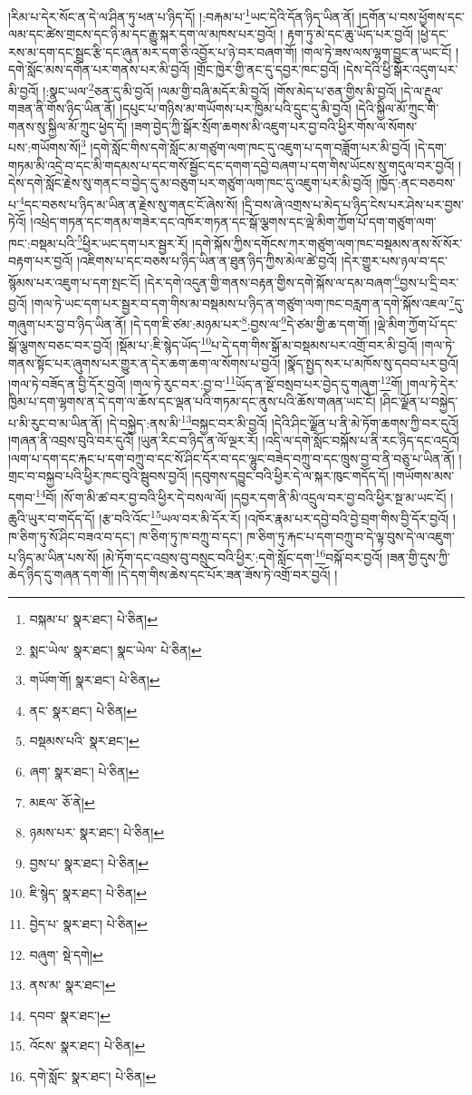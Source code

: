 །རིམ་པ་དེར་སོང་ན་དེ་ལ་ཤིན་ཏུ་ཕན་པ་ཉིད་དོ། །:བརྐམ་པ་\footnote{བསྐམ་པ་  སྣར་ཐང་།  པེ་ཅིན། }ཡང་དེའི་དོན་ཉིད་ཡིན་ནོ། །དགོན་པ་བས་ཕྱོགས་དང་ལམ་དང་ཚེས་གྲངས་དང་ཉི་མ་དང་རྒྱུ་སྐར་དག་ལ་མཁས་པར་བྱའོ། །
རྟག་ཏུ་མེ་དང་ཆུ་ཡོད་པར་བྱའོ། །ཕྱེ་དང་རས་མ་དག་དང་སྦྲང་རྩི་དང་ཞུན་མར་དག་ཅི་འབྱོར་པ་ཉེ་བར་བཞག་གོ། །གལ་ཏེ་ཟས་ལས་ལྷག་བྱུང་ན་ཡང་ངོ། །དགེ་སློང་མས་དགོན་པར་གནས་པར་མི་བྱའོ། །གྲོང་ཁྱེར་གྱི་ནང་དུ་དབྱར་ཁང་བྱའོ། །དེས་དེའི་ཕྱི་སྒོར་འདུག་པར་མི་བྱའོ། །:སྣང་ཡལ་\footnote{སྨང་ཡེལ་  སྣར་ཐང་། སྣང་ཡེལ་  པེ་ཅིན། }ཅན་དུ་མི་བྱའོ། །ལམ་གྱི་བཞི་མདོར་མི་བྱའོ། །གོས་མེད་པ་ཅན་གྱིས་མི་བྱའོ། །དེ་ལ་རྔུལ་གཟན་ནི་གོས་ཉིད་ཡིན་ནོ། །དཔུང་པ་གཉིས་མ་གཡོགས་པར་ཁྱིམ་པའི་དྲུང་དུ་མི་བྱའོ། །དེའི་སྐྱིལ་མོ་ཀྲུང་གི་གནས་སུ་སྐྱིལ་མོ་ཀྲུང་ཕྱེད་དོ། །ཟག་བྱེད་ཀྱི་སྒོར་སྲོག་ཆགས་མི་འཇུག་པར་བྱ་བའི་ཕྱིར་གོས་ལ་སོགས་པས་:གཡོགས་སོ།\footnote{གཡོག་གོ།  སྣར་ཐང་།  པེ་ཅིན། } །དགེ་སློང་གིས་དགེ་སློང་མ་གཙུག་ལག་ཁང་དུ་འཇུག་པ་དག་བཟློག་པར་མི་བྱའོ། །དེ་དག་གཏམ་མི་འདྲེ་བ་དང་མི་གདམས་པ་དང་གསོ་སྦྱོང་དང་དགག་དབྱེ་བཞག་པ་དག་གིས་ཡོངས་སུ་གདུལ་བར་བྱའོ། །དེས་དགེ་སློང་རྗེས་སུ་གནང་བ་བྱེད་དུ་མ་བཅུག་པར་གཙུག་ལག་ཁང་དུ་འཇུག་པར་མི་བྱའོ། །ཁྱོད་:ནང་བཅབས་པ་\footnote{ནང་  སྣར་ཐང་།  པེ་ཅིན། }དང་བཅས་པ་ཉིད་མ་ཡིན་ན་རྗེས་སུ་གནང་ངོ་ཞེས་སོ། །དྲི་བས་ཞེ་འགྲས་པ་མེད་པ་ཉིད་ངེས་པར་ཤེས་པར་བྱས་ཏེའོ། །འཕྲེད་གཏན་དང་གནམ་གཟེར་དང་འཁོར་གཏན་དང་སྒོ་ལྕགས་དང་ལྡེ་མིག་ཀྱོག་པོ་དག་གཙུག་ལག་ཁང་:བསྡམ་པའི་\footnote{བསྡམས་པའི་  སྣར་ཐང་། }ཕྱིར་ཡང་དག་པར་སྦྱར་རོ། །དགེ་སྐོས་ཀྱིས་དགོངས་ཀར་གཙུག་ལག་ཁང་བསྡམས་ནས་སོ་སོར་བརྟག་པར་བྱའོ། །འཇིགས་པ་དང་བཅས་པ་ཉིད་ཡིན་ན་ཐུན་ཉིད་ཀྱིས་མེལ་ཚེ་བྱའོ། །དེར་གྱུར་པས་ཉལ་བ་དང་སྙོམས་པར་འཇུག་པ་དག་སྤང་ངོ། །དེར་དགེ་འདུན་གྱི་གནས་བརྟན་གྱིས་དགེ་སྐོས་ལ་དམ་བཞག་\footnote{ཞག་  སྣར་ཐང་།  པེ་ཅིན། }བྱས་པ་དྲི་བར་བྱའོ། །གལ་ཏེ་ཡང་དག་པར་སྦྱར་བ་དག་གིས་མ་བསྡམས་པ་ཉིད་ན་གཙུག་ལག་ཁང་བརླག་ན་དགེ་སྐོས་འཇལ་\footnote{མཇལ་  ཅོ་ནེ། }དུ་གཞུག་པར་བྱ་བ་ཉིད་ཡིན་ནོ། །དེ་དག་ཇི་ཙམ་:མཉམ་པར་\footnote{ཉམས་པར་  སྣར་ཐང་།  པེ་ཅིན། }:བྱས་ལ་\footnote{བྱས་པ་  སྣར་ཐང་།  པེ་ཅིན། }དེ་ཙམ་གྱི་ཆ་དག་གོ། །ལྡེ་མིག་ཀྱོག་པོ་དང་སྒོ་ལྕགས་བཅང་བར་བྱའོ། །སྡོམ་པ་:ཇི་སྙེད་ཡོད་\footnote{ཇི་སྙེད་  སྣར་ཐང་།  པེ་ཅིན། }པ་དེ་དག་གིས་སྒོ་མ་བསྡམས་པར་འགྲོ་བར་མི་བྱའོ། །གལ་ཏེ་གནས་སྟོང་པར་ཞུགས་པར་གྱུར་ན་དེར་ཆག་ཆག་ལ་སོགས་པ་བྱའོ། །སྣོད་སྤྱད་སར་པ་མཁོས་སུ་དབབ་པར་བྱའོ། །གལ་ཏེ་བཟོད་ན་བྱི་དོར་བྱའོ། །གལ་ཏེ་རུང་བར་:བྱ་བ་\footnote{བྱེད་པ་  སྣར་ཐང་།  པེ་ཅིན། }ཡོད་ན་སྔོ་བསྲབ་པར་བྱེད་དུ་གཞུག་\footnote{བཞུག་  སྡེ་དགེ། }གོ། །གལ་ཏེ་དེར་ཁྱིམ་པ་དག་ལྷགས་ན་དེ་དག་ལ་ཆོས་དང་ལྡན་པའི་གཏམ་དང་ནུས་པའི་ཆོས་གཞན་ཡང་ངོ། །ཤིང་ལྗོན་པ་བསྐྱེད་པ་མི་རུང་བ་མ་ཡིན་ནོ། །དེ་བསྐྱེད་:ནས་མི་\footnote{ནས་མ་  སྣར་ཐང་། }བསྐྱང་བར་མི་བྱའོ། །དེའི་ཤིང་ལྗོན་པ་ནི་མེ་ཏོག་ཆགས་ཀྱི་བར་དུའོ། །གཞན་ནི་འབྲས་བུའི་བར་དུའོ། །ཡུན་རིང་བ་ཉིད་ན་ལོ་ལྔར་རོ། །འདི་ལ་དགེ་སློང་བསྐོས་པ་ནི་རང་ཉིད་དང་འདྲའོ། །ལག་པ་དག་དང་རྐང་པ་དག་བཀྲུ་བ་དང་སོ་ཤིང་དོར་བ་དང་ལྷུང་བཟེད་བཀྲུ་བ་དང་ཁྲུས་བྱ་བ་ནི་བཅུ་པ་ཡིན་ནོ། །གྲང་བ་བསྐྱབ་པའི་ཕྱིར་ཁང་བུའི་སྦུབས་བྱའོ། །དབུགས་དབྱུང་བའི་ཕྱིར་དེ་ལ་སྐར་ཁུང་གདོད་དོ། །གཡོགས་མས་དགབ་\footnote{དབབ་  སྣར་ཐང་། }བོ། །སོ་ག་མི་ཚ་བར་བྱ་བའི་ཕྱིར་དེ་བསལ་ལོ། །དབྱར་དག་ནི་མི་འདྲུལ་བར་བྱ་བའི་ཕྱིར་སྔ་མ་ཡང་ངོ། །ཆུའི་ཡུར་བ་གདོད་དོ། །རྩ་བའི་འོང་\footnote{འོངས་  སྣར་ཐང་།  པེ་ཅིན། }ཡལ་བར་མི་དོར་རོ། །འཁོར་རྣམ་པར་དབྱེ་བའི་བྱེ་བྲག་གིས་བྱི་དོར་བྱའོ། །ཁ་ཅིག་ཏུ་སོ་ཤིང་བཟའ་བ་དང་། ཁ་ཅིག་ཏུ་ཁ་བཀྲུ་བ་དང་། ཁ་ཅིག་ཏུ་རྐང་པ་དག་བཀྲུ་བ་དེ་ལྟ་བུས་དེ་ལ་འཇུག་པ་ཉིད་མ་ཡིན་པས་སོ། །མེ་ཏོག་དང་འབྲས་བུ་བསྲུང་བའི་ཕྱིར་:དགེ་སློང་དག་\footnote{དགེ་སློང་  སྣར་ཐང་།  པེ་ཅིན། }བསྐོ་བར་བྱའོ། །ཟན་གྱི་དུས་ཀྱི་ཆེད་ཉིད་དུ་གཞན་དག་གོ། །དེ་དག་གིས་ཆེས་དང་པོར་ཟན་ཟོས་ཏེ་འགྲོ་བར་བྱའོ། །
